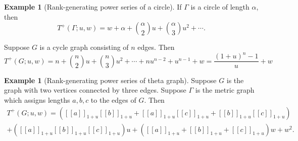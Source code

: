 \documentclass{amsart}
\theoremstyle{definition}
\newtheorem{eg}[thm]{Example}
\newcommand{\fanalog}[2]{[\![#2]\!]_{#1}}
\begin{document}
\begin{eg}[Rank-generating power series of a circle]
If $\Gamma$ is a circle of length $\alpha$, then 
\[
	T^+(\Gamma;u,w) = w + \alpha + \binom{\alpha}{2} u + \binom{\alpha}{3} u^2 + \cdots .
\]

Suppose $G$ is a cycle graph consisting of $n$ edges.
Then
\[
	T^+(G;u,w) = n + \binom{n}{2}u + \binom{n}{3} u^2 + \cdots + nu^{n-2} + u^{n-1} + w
	= \frac{(1+u)^n-1}{u} + w
\]
\end{eg}

\begin{eg}[Rank-generating power series of theta graph]
Suppose $G$ is the graph with two vertices connected by three edges.
Suppose $\Gamma$ is the metric graph which assigns lengths $a,b,c$ to the edges of $G$.
Then
\begin{multline*}
T^+(G;u,w) = ( \fanalog{1 + u}{a} \fanalog{1 + u}{b} + \fanalog{1 + u}{a} \fanalog{1 + u}{c} + \fanalog{1 + u}{b} \fanalog{1 + u}{c} ) \\
+ ( \fanalog{1 + u}{a} \fanalog{1 + u}{b} \fanalog{1 + u}{c} ) u 
+ (\fanalog{1 + u}{a} + \fanalog{1 + u}{b} + \fanalog{1 + u}{c}) w + w^2 .
\end{multline*}

\end{eg}
\end{document}
